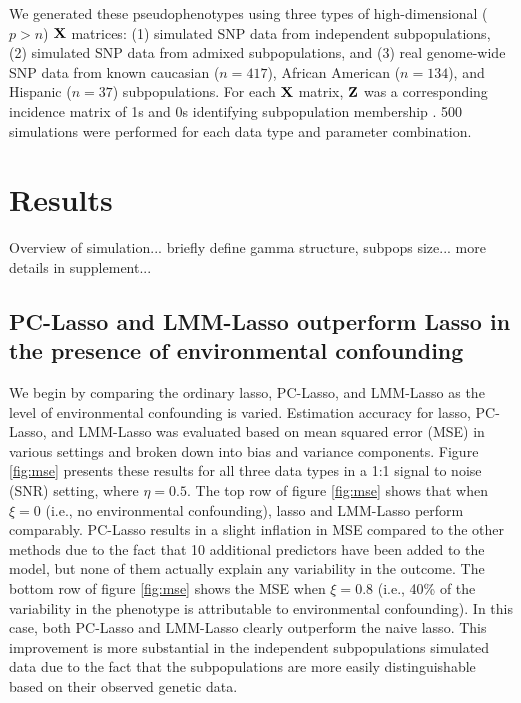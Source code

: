 We generated these pseudophenotypes using three types of high-dimensional ($p > n$) $\textbf{X}$ matrices: (1) simulated SNP data from independent subpopulations, (2) simulated SNP data from admixed subpopulations, and (3) real genome-wide SNP data from known caucasian ($n = 417$), African American ($n = 134$), and Hispanic ($n = 37$) subpopulations.  For each $\textbf{X}$ matrix, $\textbf{Z}$ was a corresponding incidence matrix of 1s and 0s identifying subpopulation membership . 500 simulations were performed for each data type and parameter combination.

\section{Results} \label{sec:results}

Overview of simulation... briefly define gamma structure, subpops size... more details in supplement...

\subsection{PC-Lasso and LMM-Lasso outperform Lasso in the presence of environmental confounding}

We begin by comparing the ordinary lasso, PC-Lasso, and LMM-Lasso as the level of environmental confounding is varied. Estimation accuracy for lasso, PC-Lasso, and LMM-Lasso was evaluated based on mean squared error (MSE) in various settings and broken down into bias and variance components.  Figure \ref{fig:mse} presents these results for all three data types in a 1:1 signal to noise (SNR) setting, where $\eta = 0.5$. The top row of figure \ref{fig:mse} shows that when $\xi = 0$ (i.e., no environmental confounding), lasso and LMM-Lasso perform comparably. PC-Lasso results in a slight inflation in MSE compared to the other methods due to the fact that 10 additional predictors have been added to the model, but none of them actually explain any variability in the outcome. The bottom row of figure \ref{fig:mse} shows the MSE when $\xi = 0.8$ (i.e., 40\% of the variability in the phenotype is attributable to environmental confounding). In this case, both PC-Lasso and LMM-Lasso clearly outperform the naive lasso. This improvement is more substantial in the independent subpopulations simulated data due to the fact that the subpopulations are more easily distinguishable based on their observed genetic data.

